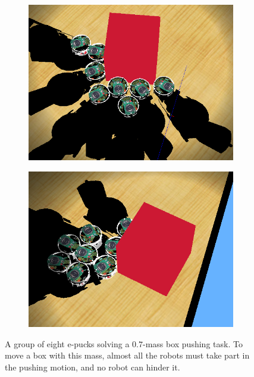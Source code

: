 \documentclass[a4paper,10pt]{article}
\begin{document}
\begin{figure}[!h]
    \centering

    \begin{subfigure}[!h]{0.45\textwidth}
        \includegraphics[width=\textwidth]{models/stresstest.PNG}
    \end{subfigure}
    \begin{subfigure}[!h]{0.45\textwidth}
        \includegraphics[width=\textwidth]{models/stresstest2.PNG}
    \end{subfigure}

    \caption{A group of eight e-pucks solving a $0.7$-mass box pushing task.
    To move a box with this mass, almost all the robots must take part in the
    pushing motion, and no robot can hinder it.}
\end{figure}


\label{sec:b2}
\end{document}
